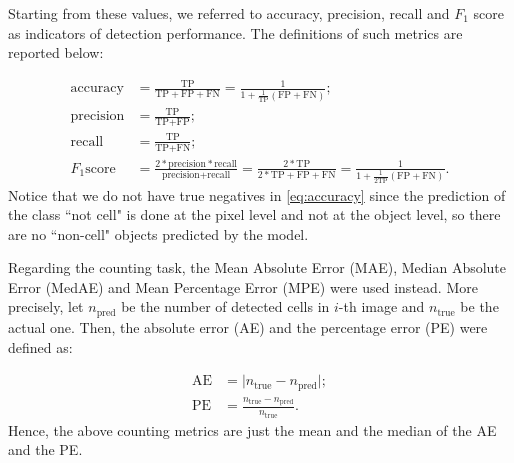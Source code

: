Starting from these values, we referred to accuracy, precision, recall and $F_1$ score as indicators of detection performance.
The definitions of such metrics are reported below:

\begin{align}
\text{accuracy} &=  \frac{\text{TP}}{\text{TP} + \text{FP} + \text{FN}}
= \frac{\text{1}}{\text{1} + \frac{1}{\text{TP}} \left(\text{FP} + \text{FN}\right)}
\label{eq:accuracy}; \\ 
\text{precision} &=    \frac{\text{TP}}{\text{TP} + \text{FP}}; \\
\text{recall} &=    \frac{\text{TP}}{\text{TP} + \text{FN}}; \\ 
F_1 \text{score} &=  \frac{2 * \text{precision} * \text{recall}}{\text{precision} + \text{recall}}
= \frac{2*\text{TP}}{2*\text{TP} + \text{FP} + \text{FN}} 
= \frac{\text{1}}{\text{1} + \frac{1}{\text{2TP}} \left(\text{FP} + \text{FN}\right)}
\label{eq:F1}.
\end{align}
Notice that we do not have true negatives in \cref{eq:accuracy} since the prediction of the class ``not cell" is done at the pixel level and not at the object level, so there are no ``non-cell" objects predicted by the model.

Regarding the counting task, the Mean Absolute Error (MAE), Median Absolute Error (MedAE) and Mean Percentage Error (MPE) were used instead. More precisely, let $n_{\text{pred}}$ be the number of detected cells in $i$-th image  and $n_{\text{true}}$ be the actual one. Then, the absolute error (AE) and the percentage error (PE) were defined as:

\begin{align}
\text{AE} &= \lvert n_{\text{true}} - n_{\text{pred}}\rvert ;\\
\text{PE} &= \frac{ n_{\text{true}} - n_{\text{pred}}}{n_{\text{true}} 
}.
\end{align}
Hence, the above counting metrics are just the mean and the median of the AE and the PE.

